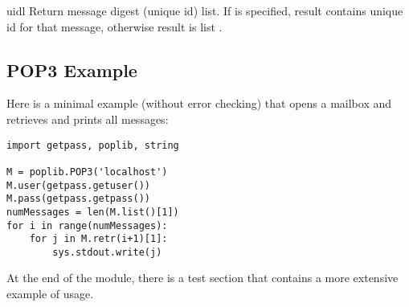 \begin{methoddesc}{uidl}{}
Return message digest (unique id) list.
If  is specified, result contains unique id for that
message, otherwise result is list .
\end{methoddesc}


\subsection{POP3 Example}
\label{pop3-example}

Here is a minimal example (without error checking) that opens a
mailbox and retrieves and prints all messages:

\begin{verbatim}
import getpass, poplib, string

M = poplib.POP3('localhost')
M.user(getpass.getuser())
M.pass(getpass.getpass())
numMessages = len(M.list()[1])
for i in range(numMessages):
    for j in M.retr(i+1)[1]:
        sys.stdout.write(j)
\end{verbatim}

At the end of the module, there is a test section that contains a more
extensive example of usage.

